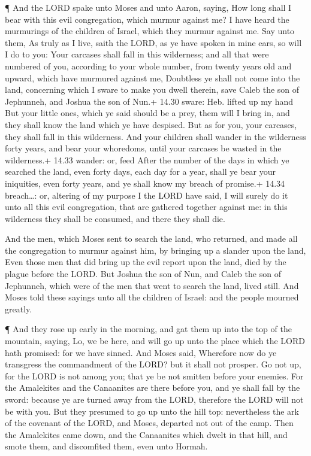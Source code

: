  ¶ And the LORD spake unto Moses and unto Aaron, saying,
 How long shall I bear with this evil congregation, which
murmur against me? I have heard the murmurings of the children of
Israel, which they murmur against me.  Say unto them, As
truly as I live, saith the LORD, as ye have spoken in mine ears, so will
I do to you:  Your carcases shall fall in this wilderness;
and all that were numbered of you, according to your whole number, from
twenty years old and upward, which have murmured against me,
 Doubtless ye shall not come into the land, concerning
which I sware to make you dwell therein, save Caleb the son of
Jephunneh, and Joshua the son of Nun.+ 14.30 sware: Heb. lifted up my
hand  But your little ones, which ye said should be a prey,
them will I bring in, and they shall know the land which ye have
despised.  But as for you, your carcases, they shall fall
in this wilderness.  And your children shall wander in the
wilderness forty years, and bear your whoredoms, until your carcases be
wasted in the wilderness.+ 14.33 wander: or, feed  After
the number of the days in which ye searched the land, even forty days,
each day for a year, shall ye bear your iniquities, even forty years,
and ye shall know my breach of promise.+ 14.34 breach\ldots: or,
altering of my purpose  I the LORD have said, I will surely
do it unto all this evil congregation, that are gathered together
against me: in this wilderness they shall be consumed, and there they
shall die.

 And the men, which Moses sent to search the land, who
returned, and made all the congregation to murmur against him, by
bringing up a slander upon the land,  Even those men that
did bring up the evil report upon the land, died by the plague before
the LORD.  But Joshua the son of Nun, and Caleb the son of
Jephunneh, which were of the men that went to search the land, lived
still.  And Moses told these sayings unto all the children
of Israel: and the people mourned greatly.

 ¶ And they rose up early in the morning, and gat them up
into the top of the mountain, saying, Lo, we be here, and will go up
unto the place which the LORD hath promised: for we have sinned.
 And Moses said, Wherefore now do ye transgress the
commandment of the LORD? but it shall not prosper.  Go not
up, for the LORD is not among you; that ye be not smitten before your
enemies.  For the Amalekites and the Canaanites are there
before you, and ye shall fall by the sword: because ye are turned away
from the LORD, therefore the LORD will not be with you. 
But they presumed to go up unto the hill top: nevertheless the ark of
the covenant of the LORD, and Moses, departed not out of the camp.
 Then the Amalekites came down, and the Canaanites which
dwelt in that hill, and smote them, and discomfited them, even unto
Hormah.

